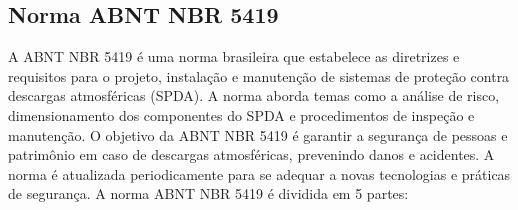 \documentclass[a4paper, 12pt, onecolumn,singlespacing]{article}
\begin{document}
		\subsection{Norma ABNT NBR 5419}
		
		A ABNT NBR 5419 é uma norma brasileira que estabelece as diretrizes e requisitos para o projeto, instalação e manutenção de sistemas de proteção contra descargas atmosféricas (SPDA). A norma aborda temas como a análise de risco, dimensionamento dos componentes do SPDA e procedimentos de inspeção e manutenção. O objetivo da ABNT NBR 5419 é garantir a segurança de pessoas e patrimônio em caso de descargas atmosféricas, prevenindo danos e acidentes. A norma é atualizada periodicamente para se adequar a novas tecnologias e práticas de segurança.
		A norma ABNT NBR 5419 é dividida em 5 partes:
		
\end{document}
